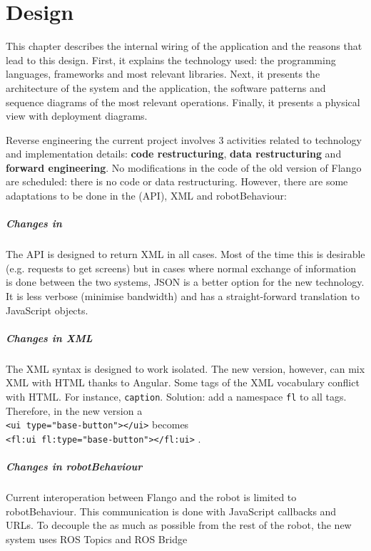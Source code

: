 \chapter{Design}
\label{chap:design}
This chapter describes the internal wiring of the application and the reasons that lead to this design.
First, it explains the technology used: the programming languages, frameworks and most relevant libraries.
Next, it presents the architecture of the system and the application, the software patterns and sequence diagrams of the most relevant operations.
Finally, it presents a physical view with deployment diagrams.

Reverse engineering the current project involves 3 activities related to technology and implementation details: \textbf{code restructuring}, \textbf{data restructuring} and\textbf{ forward engineering}.
No modifications in the code of the old version of Flango \cm are scheduled: there is no code or data restructuring.
However, there are some adaptations to be done in the \flangobe (\ac{API}), \ac{XML} and robotBehaviour:

\paragraph{Changes in \flangobe} The \ac{API} is designed to return \ac{XML} in all cases.
Most of the time this is desirable (e.g. requests to get screens) but in cases where normal exchange of information is done between the two systems, \ac{JSON} is a better option for the new technology.
It is less verbose (minimise bandwidth) and has a straight-forward translation to JavaScript objects.

\paragraph{Changes in \ac{XML}} The \ac{XML} syntax is designed to work isolated.
The new version, however, can mix \ac{XML} with \ac{HTML} thanks to Angular.
Some tags of the \ac{XML} vocabulary conflict with \ac{HTML}. For instance, \texttt{caption}. Solution: add a namespace \texttt{fl} to all tags. 
Therefore, in the new version a \\ \lstinline$<ui type="base-button"></ui>$  becomes\\ \lstinline$<fl:ui fl:type="base-button"></fl:ui>$ .

\paragraph{Changes in robotBehaviour} Current interoperation between Flango \cm and the robot is limited to robotBehaviour.
This communication is done with JavaScript callbacks and \acp{URL}.
To decouple the \cm as much as possible from the rest of the robot, the new system uses \ac{ROS} Topics and ROS Bridge

